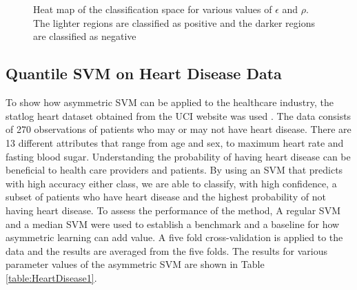 \documentclass[twoside,11pt]{article}
\begin{document}
\begin{figure}[htp]
  \begin{center}
     \\
     \\
  \end{center}
  \caption{Heat map of the classification space for various values of $\epsilon$ and $\rho$. The lighter regions are classified as positive and the darker regions are classified as negative}
  \label{fig:edge}
\end{figure}



\subsection{Quantile SVM on Heart Disease Data}
To show how asymmetric SVM can be applied to the healthcare industry, the statlog heart dataset obtained from the UCI website was used \citep{Frank10}. The data consists of 270 observations of patients who may or may not have heart disease. There are 13 different attributes that range from age and sex, to maximum heart rate and fasting blood sugar. Understanding the probability of having heart disease can be beneficial to health care providers and patients. By using an SVM that predicts with high accuracy either class, we are able to classify, with high confidence, a subset of patients who have heart disease and the highest probability of not having heart disease. To assess the performance of the method, A regular SVM and a median SVM were used to establish a benchmark and a baseline for how asymmetric learning can add value. A five fold cross-validation is applied to the data and the results are averaged from the five folds. The results for various parameter values of the asymmetric SVM are shown in Table \ref{table:HeartDisease1}. 
\end{document}
